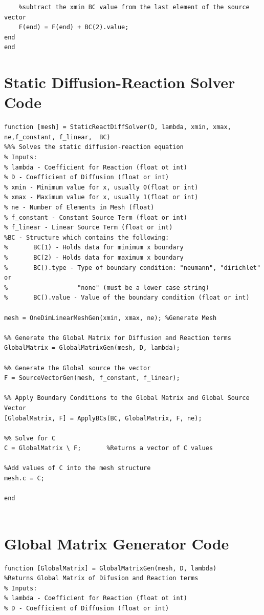 \documentclass[11pt]{article}
\begin{document}
\begin{appendices}
\begin{lstlisting}
    %subtract the xmin BC value from the last element of the source vector 
    F(end) = F(end) + BC(2).value;
end   
end
\end{lstlisting}
\pagebreak



\section{Static Diffusion-Reaction Solver Code}
\label{ap:SDRS}
\begin{lstlisting}
function [mesh] = StaticReactDiffSolver(D, lambda, xmin, xmax, ne,f_constant, f_linear,  BC)
%%% Solves the static diffusion-reaction equation
% Inputs:
% lambda - Coefficient for Reaction (float ot int)
% D - Coefficient of Diffusion (float or int)
% xmin - Minimum value for x, usually 0(float or int)
% xmax - Maximum value for x, usually 1(float or int)
% ne - Number of Elements in Mesh (float)
% f_constant - Constant Source Term (float or int)
% f_linear - Linear Source Term (float or int)
%BC - Structure which contains the following:
%       BC(1) - Holds data for minimum x boundary
%       BC(2) - Holds data for maximum x boundary
%       BC().type - Type of boundary condition: "neumann", "dirichlet" or
%                   "none" (must be a lower case string)
%       BC().value - Value of the boundary condition (float or int)

mesh = OneDimLinearMeshGen(xmin, xmax, ne); %Generate Mesh

%% Generate the Global Matrix for Diffusion and Reaction terms
GlobalMatrix = GlobalMatrixGen(mesh, D, lambda);

%% Generate the Global source the vector
F = SourceVectorGen(mesh, f_constant, f_linear);

%% Apply Boundary Conditions to the Global Matrix and Global Source Vector
[GlobalMatrix, F] = ApplyBCs(BC, GlobalMatrix, F, ne);

%% Solve for C
C = GlobalMatrix \ F;       %Returns a vector of C values

%Add values of C into the mesh structure
mesh.c = C;

end


\end{lstlisting}
\pagebreak

\section{Global Matrix Generator Code}
\label{ap:GM}
\begin{lstlisting}
function [GlobalMatrix] = GlobalMatrixGen(mesh, D, lambda)
%Returns Global Matrix of Difusion and Reaction terms
% Inputs:
% lambda - Coefficient for Reaction (float ot int)
% D - Coefficient of Diffusion (float or int)



\end{lstlisting}
\end{appendices}
\end{document}
